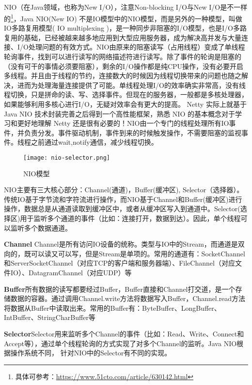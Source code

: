 \documentclass[../../../interview-questions.tex]{subfiles}
\begin{document}
\subsection{\color{red}{Java NIO原理}}

NIO（在Java领域，也称为New I/O），注意Non-blocking I/O与New I/O是不一样的\footnote{具体可参考：\url{https://www.51cto.com/article/630142.html}}，Java NIO(New IO) 不是IO模型中的NIO模型，而是另外的一种模型，叫做IO多路复用模型( IO multiplexing )，是一种同步非阻塞的I/O模型，也是I/O多路复用的基础，已经被越来越多地应用到大型应用服务器，成为解决高并发与大量连接、I/O处理问题的有效方式。NIO由原来的阻塞读写（占用线程）变成了单线程轮询事件，找到可以进行读写的网络描述符进行读写。除了事件的轮询是阻塞的（没有可干的事情必须要阻塞），剩余的I/O操作都是纯CPU操作，没有必要开启多线程。并且由于线程的节约，连接数大的时候因为线程切换带来的问题也随之解决，进而为处理海量连接提供了可能。单线程处理I/O的效率确实非常高，没有线程切换，只是拼命的读、写、选择事件。但现在的服务器，一般都是多核处理器，如果能够利用多核心进行I/O，无疑对效率会有更大的提高。
Netty 实际上就基于 Java NIO 技术封装完善之后得到一个高性能框架，熟悉 NIO 的基本概念对于学习和更好地理解 Netty 还是很有必要的！NIO由一个专门的线程处理所有IO事件，并负责分发。事件驱动机制，事件到来的时候触发操作，不需要阻塞的监视事件。线程之前通过wait,notify通信，减少线程切换。

\begin{figure}[htbp]
	\centering
	\texttt{[image: nio-selector.png]}
	\caption{NIO模型}
	\label{fig:nioselector}
\end{figure}


NIO主要有三大核心部分：Channel(通道)，Buffer(缓冲区), Selector（选择器）。传统IO基于字节流和字符流进行操作，而NIO基于Channel和Buffer(缓冲区)进行操作，数据总是从通道读取到缓冲区中，或者从缓冲区写入到通道中。Selector(选择区)用于监听多个通道的事件（比如：连接打开，数据到达）。因此，单个线程可以监听多个数据通道。

\textbf{Channel} Channel是所有访问IO设备的统称。类型与IO中的Stream，而通道是双向的，既可以读又可以写，但是Stream是单项的。常用的通道有：SocketChannel和ServerSocketChannel（对应TCP的客户端和服务器端）、FileChannel（对应文件IO）、DatagramChannel（对应UDP）等

\textbf{Buffer}所有数据的读写都要经过Buffer，Buffer直接和Channel打交道，是一个存储数据的容器。通过调用Channel.write方法将数据写入Buffer，Channel.read方法将数据从Buffer中读取出来。常用的Buffer有：ByteBuffer、LongBuffer、IntBuffer、StringCharBuffer等

\textbf{Selector}Selector用来监听多个Channel的事件（比如：Read、Write、Connect和Accept等），通过单个线程轮询的方式实现了对多个Channel的监听。Java NIO根据操作系统不同， 针对NIO中的Selector有不同的实现。
\end{document}
